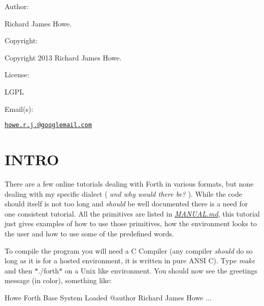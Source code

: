 

Author\-:


\begin{DoxyItemize}
\item Richard James Howe.
\end{DoxyItemize}

Copyright\-:


\begin{DoxyItemize}
\item Copyright 2013 Richard James Howe.
\end{DoxyItemize}

License\-:


\begin{DoxyItemize}
\item L\-G\-P\-L
\end{DoxyItemize}

Email(s)\-:


\begin{DoxyItemize}
\item \href{mailto:howe.r.j.89@googlemail.com}{\tt howe.\-r.\-j.@googlemail.\-com}
\end{DoxyItemize}

\section*{I\-N\-T\-R\-O}

There are a few online tutorials dealing with Forth in various formats, but none dealing with my specific dialect ( {\itshape and why would there be?} ). While the code should itself is not too long and {\itshape should} be well documented there is a need for one consistent tutorial. All the primitives are listed in {\itshape \hyperlink{MANUAL_8md}{M\-A\-N\-U\-A\-L.\-md}}, this tutorial just gives examples of how to use those primitives, how the environment looks to the user and how to use some of the predefined words.

To compile the program you will need a C Compiler (any compiler {\itshape should} do so long as it is for a hosted environment, it is written in pure A\-N\-S\-I C). Type {\itshape make} and then $\ast$./forth$\ast$ on a Unix like environment. You should now see the greetings message (in color), something like\-:

\begin{DoxyVerb}    Howe Forth
    Base System Loaded
    @author   Richard James Howe
    ...\end{DoxyVerb}


